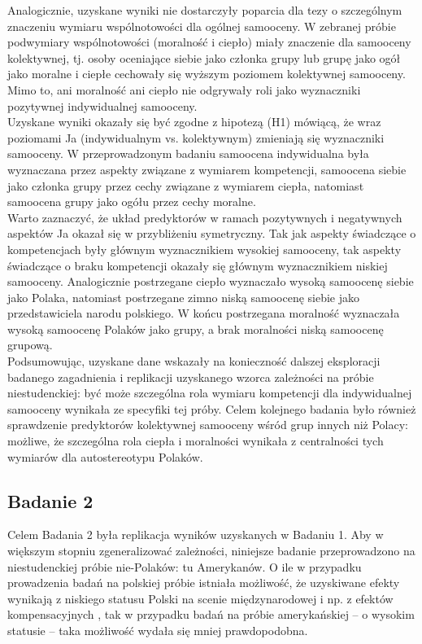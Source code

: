 \documentclass[man]{apa6}
\begin{document}
Analogicznie, uzyskane wyniki nie dostarczyły poparcia dla tezy o szczególnym znaczeniu wymiaru wspólnotowości dla ogólnej samooceny. W zebranej próbie podwymiary wspólnotowości (moralność i ciepło) miały znaczenie dla samooceny kolektywnej, tj. osoby oceniające siebie jako członka grupy lub grupę jako ogół jako moralne i ciepłe cechowały się wyższym poziomem kolektywnej samooceny. Mimo to, ani moralność ani ciepło nie odgrywały roli jako wyznaczniki pozytywnej indywidualnej samooceny.\\

Uzyskane wyniki okazały się być zgodne z hipotezą (H1) mówiącą, że wraz poziomami Ja (indywidualnym vs. kolektywnym) zmieniają się wyznaczniki samooceny. W przeprowadzonym badaniu samoocena indywidualna była wyznaczana przez aspekty związane z wymiarem kompetencji, samoocena siebie jako członka grupy przez cechy związane z wymiarem ciepła, natomiast samoocena grupy jako ogółu przez cechy moralne. \\

Warto zaznaczyć, że układ predyktorów w ramach pozytywnych i negatywnych aspektów Ja okazał się w przybliżeniu symetryczny. Tak jak aspekty świadczące o kompetencjach były głównym wyznacznikiem wysokiej samooceny, tak aspekty świadczące o braku kompetencji okazały się głównym wyznacznikiem niskiej samooceny. Analogicznie postrzegane ciepło wyznaczało wysoką samoocenę siebie jako Polaka, natomiast postrzegane zimno niską samoocenę siebie jako przedstawiciela narodu polskiego. W końcu postrzegana moralność wyznaczała wysoką samoocenę Polaków jako grupy, a brak moralności niską samoocenę grupową. \\

Podsumowując, uzyskane dane wskazały na konieczność dalszej eksploracji badanego zagadnienia i replikacji uzyskanego wzorca zależności na próbie niestudenckiej: być może szczególna rola wymiaru kompetencji dla indywidualnej samooceny wynikała ze specyfiki tej próby. Celem kolejnego badania było również sprawdzenie predyktorów kolektywnej samooceny wśród grup innych niż Polacy: możliwe, że szczególna rola ciepła i moralności wynikała z centralności tych wymiarów dla autostereotypu Polaków. \\

\newpage
\subsection{Badanie 2}
Celem Badania 2 była replikacja wyników uzyskanych w Badaniu 1. Aby w większym stopniu zgeneralizować zależności, niniejsze badanie przeprowadzono na niestudenckiej próbie nie-Polaków: tu Amerykanów. O ile w przypadku prowadzenia badań na polskiej próbie istniała możliwość, że uzyskiwane efekty wynikają z niskiego statusu Polski na scenie międzynarodowej i np. z efektów kompensacyjnych \parencite[zob. np.][]{judd2005fundamental, oldmeadow2010social}, tak w przypadku badań na próbie amerykańskiej -- o wysokim statusie -- taka możliwość wydała się mniej prawdopodobna.\\
\end{document}
